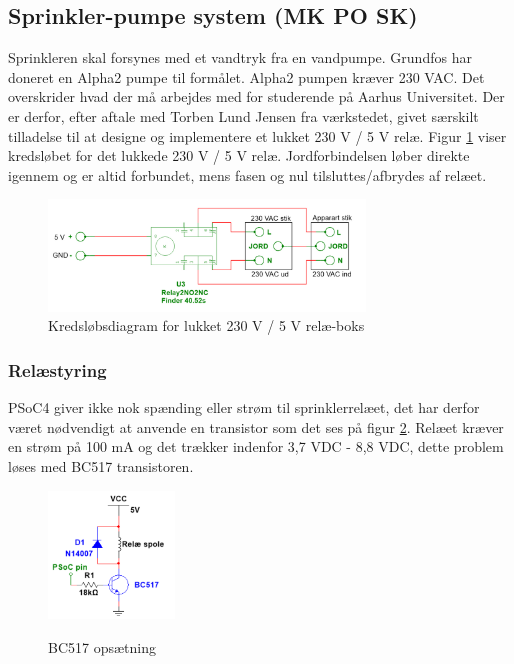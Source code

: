 
\subsection{Sprinkler-pumpe system (MK PO SK)}

Sprinkleren skal forsynes med et vandtryk fra en vandpumpe. Grundfos har doneret en Alpha2 pumpe til formålet. Alpha2 pumpen kræver 230 VAC. Det overskrider hvad der må arbejdes med for studerende på Aarhus Universitet. Der er derfor, efter aftale med Torben Lund Jensen fra værkstedet, givet særskilt tilladelse til at designe og implementere et lukket 230 V / 5 V relæ. Figur \ref{lab:Relay_box} viser kredsløbet for det lukkede 230 V / 5 V relæ. Jordforbindelsen løber direkte igennem og er altid forbundet, mens fasen og nul tilsluttes/afbrydes af relæet.  

\begin{figure}[H]
  \centering
    \includegraphics[width=0.75\textwidth]{Billeder/230VAC_KREDS}
    \caption{Kredsløbsdiagram for lukket 230 V / 5 V relæ-boks}
    \label{lab:Relay_box}
\end{figure}

\subsubsection{Relæstyring}

PSoC4 giver ikke nok spænding eller strøm til sprinklerrelæet, det har derfor været nødvendigt at anvende en transistor som det ses på figur \ref{lab:BC517}. Relæet kræver en strøm på 100 mA og det trækker indenfor 3,7 VDC - 8,8 VDC, dette problem løses med BC517 transistoren. 

\begin{figure}[H] \centering
{\includegraphics[width=0.3\textwidth]{Billeder/BC517}}
\caption{BC517 opsætning}
\label{lab:BC517}
\raggedright
\end{figure} 

